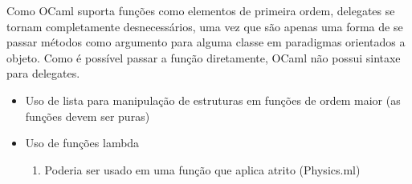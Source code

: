 \documentclass[a4paper,10pt]{article}
\begin{document}
	Como OCaml suporta funções como elementos de primeira ordem, delegates se tornam completamente desnecessários, uma vez que são apenas uma forma de se passar métodos como argumento para alguma classe em paradigmas orientados a objeto. Como é possível passar a função diretamente, OCaml não possui sintaxe para delegates.
	
\begin{itemize}  
 \item Uso de lista para manipulação de estruturas em funções de ordem maior (as funções devem ser puras)
 \item Uso de funções lambda
		{\color{notDone}
		\begin{enumerate}
			\item Poderia ser usado em uma função que aplica atrito (Physics.ml)
		\end{enumerate}
		}

\end{itemize}
\end{document}
